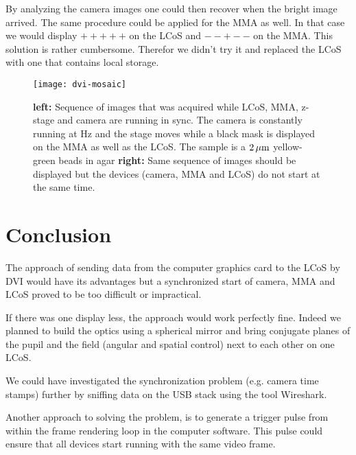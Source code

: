 By analyzing the camera images one could then recover when the bright
image arrived. The same procedure could be applied for the MMA as
well. In that case we would display $+++++$ on the LCoS and $--+--$ on
the MMA. This solution is rather cumbersome. Therefor we didn't try
it and replaced the LCoS with one that contains local storage.

\begin{figure}[!hbt]
  \centering
  \texttt{[image: dvi-mosaic]}
  \caption{{\bf left:} Sequence of images that was acquired while LCoS,
    MMA, z-stage and camera are running in sync. The camera is
    constantly running at \unit[30]{Hz} and the stage moves while a
    black mask is displayed on the MMA as well as the LCoS. The sample
    is a $\unit[2]{\mu m}$ yellow-green beads in agar {\bf right:}
    Same sequence of images should be displayed but the devices
    (camera, MMA and LCoS) do not start at the same time.}
  \label{fig:dvi-mosaic}
\end{figure}

\section{Conclusion}
The approach of sending data from the computer graphics card to the
LCoS by DVI would have its advantages but a synchronized start of
camera, MMA and LCoS proved to be too difficult or impractical.

If there was one display less, the approach would work perfectly fine.
Indeed we planned to build the optics using a spherical mirror and
bring conjugate planes of the pupil and the field (angular and spatial
control) next to each other on one LCoS.

We could have investigated the synchronization problem (e.g. camera
time stamps) further by sniffing data on the USB stack using the tool
Wireshark.

Another approach to solving the problem, is to generate a trigger
pulse from within the frame rendering loop in the computer
software. This pulse could ensure that all devices start running with
the same video frame.
